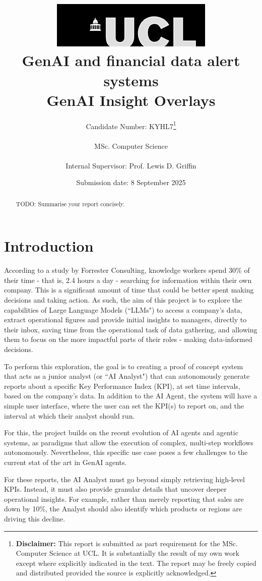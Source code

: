 \documentclass[a4paper]{report}
\title{{\vspace{-14em} \includegraphics[scale=0.4]{ucl_logo.png}}\\
{{\Huge GenAI and financial data alert systems}}\\
{\large GenAI Insight Overlays}\\
}
\date{Submission date: 8 September 2025}
\author{Candidate Number: KYHL7\thanks{
{\bf Disclaimer:}
This report is submitted as part requirement for the MSc. Computer Science at UCL. It is substantially the result of my own work except where explicitly indicated in the text. The report may be freely copied and distributed provided the source is explicitly acknowledged.}
\\ \\
MSc. Computer Science\\ \\
Internal Supervisor: Prof. Lewis D. Griffin}
\begin{document}
 
\onehalfspacing

\maketitle
\begin{abstract}
TODO: Summarise your report concisely.
\end{abstract}

\tableofcontents

\setcounter{page}{1}


\chapter{Introduction}
\label{chapter:introduction}

According to a study by Forrester Consulting, knowledge workers spend 30\% of their time - that is, 2.4 hours a day - searching for information within their own company\cite{forrester2022}. This is a significant amount of time that could be better spent making decisions and taking action. As such, the aim of this project is to explore the capabilities of Large Language Models (``LLMs") to access a company's data, extract operational figures and provide initial insights to managers, directly to their inbox, saving time from the operational task of data gathering, and allowing them to focus on the more impactful parts of their roles - making data-informed decisions.

To perform this exploration, the goal is to creating a proof of concept system that acts as a junior analyst (or ``AI Analyst") that can autonomously generate reports about a specific Key Performance Index (KPI), at set time intervals, based on the company's data. In addition to the AI Agent, the system will have a simple user interface, where the user can set the KPI(s) to report on, and the interval at which their analyst should run.

For this, the project builds on the recent evolution of AI agents and agentic systems, as paradigms that allow the execution of complex, multi-step workflows autonomously. Nevertheless, this specific use case poses a few challenges to the current stat of the art in GenAI agents.

For these reports, the AI Analyst must go beyond simply retrieving high-level KPIs. Instead, it must also provide granular details that uncover deeper operational insights. For example, rather than merely reporting that sales are down by 10\%, the Analyst should also identify which products or regions are driving this decline.
\end{document}
